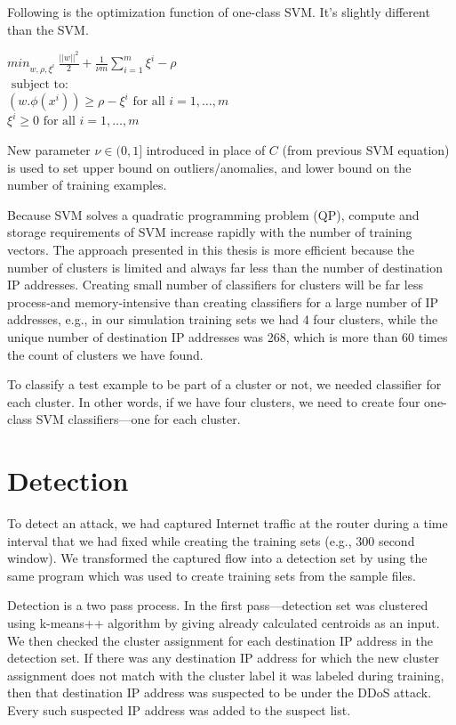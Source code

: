 \documentclass[12pt,oneside,a4paper]{article}
\begin{document}
Following is the optimization function of one-class SVM. It's slightly different than the SVM. \cite{svm}

\begin{center}
  ${min}_{w,\rho,\xi^i} \ \frac{||w||^2}{2} + \frac{1}{\nu m} \sum_{i=1}^m \xi^i - \rho$ \\
  $\mbox{ subject to: }$ \\
  $(w.\phi(x^i)) \geq \rho - \xi^i \mbox{ for all } i = 1, \dots, m$ \\
  \hspace{2cm} $\xi^i \geq 0 \mbox{ for all } i = 1, \dots, m$ \\
\end{center}

New parameter $\nu \in (0,1]$ introduced in place of $C$ (from previous SVM equation) is used to set upper bound on outliers/anomalies, and lower bound on the number of training examples.

Because SVM solves a quadratic programming problem (QP), compute and storage requirements of SVM increase rapidly with the number of training vectors. The approach presented in this thesis is more efficient because the number of clusters is limited and always far less than the number of destination IP addresses. Creating small number of classifiers for clusters will be far less process-and memory-intensive than creating classifiers for a large number of IP addresses, e.g., in our simulation training sets we had 4 four clusters, while the unique number of destination IP addresses was 268, which is more than 60 times the count of clusters we have found.

To classify a test example to be part of a cluster or not, we needed classifier for each cluster. In other words, if we have four clusters, we need to create four one-class SVM classifiers---one for each cluster.
\pagebreak
\section{Detection} \label{sec:Detection}

To detect an attack, we had captured Internet traffic at the router during a time interval that we had fixed while creating the training sets (e.g., 300 second window). We transformed the captured flow into a detection set by using the same program which was used to create training sets from the sample files.

Detection is a two pass process. In the first pass---detection set was clustered using k-means++ algorithm by giving already calculated centroids as an input. We then checked the cluster assignment for each destination IP address in the detection set. If there was any destination IP address for which the new cluster assignment does not match with the cluster label it was labeled during training, then that destination IP address was suspected to be under the DDoS attack. Every such suspected IP address was added to the suspect list.
\end{document}
